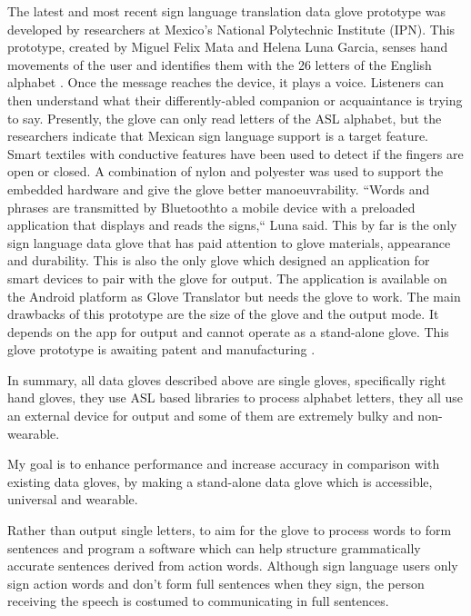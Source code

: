 The latest and most recent sign language translation data glove prototype was developed by researchers at Mexico's National Polytechnic Institute (IPN). This prototype, created by Miguel Felix Mata and Helena Luna Garcia, senses hand movements of the user and identifies them with the 26 letters of the English alphabet \parencite{MexicoPoly}. Once the message reaches the device, it plays a voice. Listeners can then understand what their differently-abled companion or acquaintance is trying to say. Presently, the glove can only read letters of the ASL alphabet, but the researchers indicate that Mexican sign language support is a target feature. Smart textiles with conductive features have been used to detect if the fingers are open or closed. A combination of nylon and polyester was used to support the embedded hardware and give the glove better manoeuvrability. ``Words and phrases are transmitted by Bluetooth\texttrademark to a mobile device with a preloaded application that displays and reads the signs,`` \parencite{MexicoPoly} Luna said. This by far is the only sign language data glove that has paid attention to glove materials, appearance and durability. This is also the only glove which designed an application for smart devices to pair with the glove for output. The application is available on the Android platform as Glove Translator but needs the glove to work. The main drawbacks of this prototype are the size of the glove and the output mode. It depends on the app for output and cannot operate as a stand-alone glove. This glove prototype is awaiting patent and manufacturing \parencite{MexicoPoly}.

In summary, all data gloves described above are single gloves, specifically right hand gloves, they use ASL based libraries to process alphabet letters, they all use an external device for output and some of them are extremely bulky and non-wearable. 

My goal is to enhance performance and increase accuracy in comparison with existing data gloves, by making a stand-alone data glove which is accessible, universal and wearable. 

Rather than output single letters, to aim for the glove to process words to form sentences and program a software which can help structure grammatically accurate sentences derived from action words. Although sign language users only sign action words and don’t form full sentences when they sign, the person receiving the speech is costumed to communicating in full sentences. 

